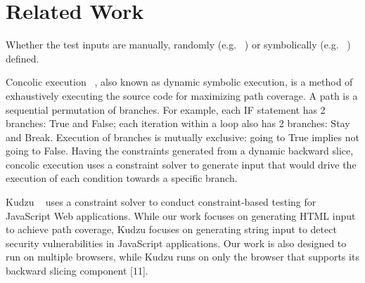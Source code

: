 \section{Related Work}
Whether the test inputs are manually, randomly (e.g. ~\cite{artemis}) or symbolically (e.g. ~\cite{kudzu, jalangi}) defined.



Concolic execution ~\cite{cute}, also known as dynamic symbolic execution, is a method of exhaustively executing the source code for maximizing path coverage. 
A path is a sequential permutation of branches.  For example, each IF statement has 2 branches: True and False; each iteration within a loop also has 2 branches: Stay and Break. 
Execution of branches is mutually exclusive: going to True implies not going to False.
Having the constraints generated from a dynamic backward slice, concolic execution uses a constraint solver to generate input that would drive the execution of each condition towards a specific branch. 

Kudzu ~\cite{kudzu} uses a constraint solver to conduct constraint-based testing for JavaScript Web applications. 
While our work focuses on generating HTML input to achieve path coverage, Kudzu focuses on generating string input to detect security vulnerabilities in JavaScript applications. 
Our work is also designed to run on multiple browsers, while Kudzu runs on only the browser that supports its backward slicing component [11].
